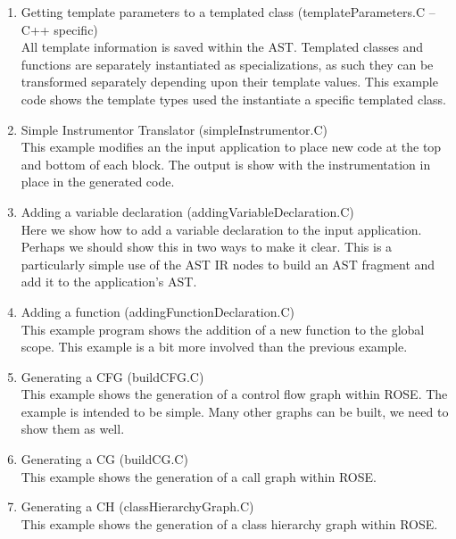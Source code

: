 \begin{enumerate}
     \item Getting template parameters to a templated class (templateParameters.C -- C++ specific) \\
           All template information is saved within the AST.  Templated classes and
           functions are separately instantiated as specializations, as such they
           can be transformed separately depending upon their template values.
           This example code shows the template types used the instantiate a specific
           templated class.

     \item Simple Instrumentor Translator (simpleInstrumentor.C) \\
           This example modifies an the input application to place new code at the top and
           bottom of each block.  The output is show with the instrumentation in place 
           in the generated code.

     \item Adding a variable declaration (addingVariableDeclaration.C) \\
           Here we show how to add a variable declaration to the input application.
           Perhaps we should show this in two ways to make it clear.  This is
           a particularly simple use of the AST IR nodes to build an AST fragment
           and add it to the application's AST.

     \item Adding a function (addingFunctionDeclaration.C) \\
           This example program shows the addition of a new function 
           to the global scope.  This example is a bit more involved
           than the previous example.

     \item Generating a CFG (buildCFG.C) \\
           This example shows the generation of a control flow graph 
           within ROSE.  The example is intended to be simple.  Many other
           graphs can be built, we need to show them as well.

     \item Generating a CG (buildCG.C) \\
           This example shows the generation of a call graph 
           within ROSE.
     \item Generating a CH (classHierarchyGraph.C) \\
           This example shows the generation of a class hierarchy graph 
           within ROSE.


\end{enumerate}

